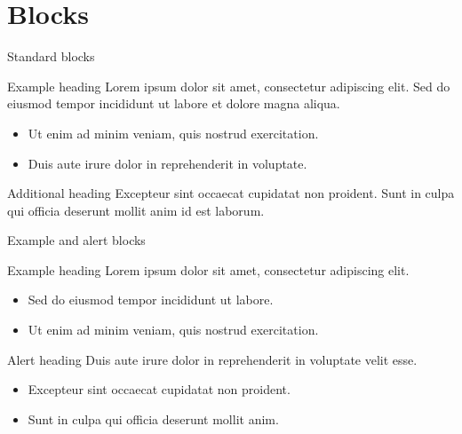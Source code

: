 \section{Blocks}

\begin{frame}[t]{Standard blocks}
    \begin{block}{Example heading}
        Lorem ipsum dolor sit amet, consectetur adipiscing elit. Sed do
        eiusmod tempor incididunt ut labore et dolore magna aliqua.
        \begin{itemize}
            \item Ut enim ad minim veniam, quis nostrud exercitation.
            \item Duis aute irure dolor in reprehenderit in voluptate.
        \end{itemize}
    \end{block}
    \begin{block}{Additional heading}
        Excepteur sint occaecat cupidatat non proident. Sunt in culpa qui
        officia deserunt mollit anim id est laborum.
    \end{block}
\end{frame}

\begin{frame}[t]{Example and alert blocks}
    \begin{exampleblock}{Example heading}
        Lorem ipsum dolor sit amet, consectetur adipiscing elit.
        \begin{itemize}
            \item Sed do eiusmod tempor incididunt ut labore.
            \item Ut enim ad minim veniam, quis nostrud exercitation.
        \end{itemize}
    \end{exampleblock}
    \begin{alertblock}{Alert heading}
        Duis aute irure dolor in reprehenderit in voluptate velit esse.
        \begin{itemize}
            \item Excepteur sint occaecat cupidatat non proident.
            \item Sunt in culpa qui officia deserunt mollit anim.
        \end{itemize}
    \end{alertblock}
\end{frame}

